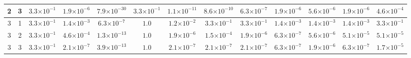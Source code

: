 \begin{landscape}
\begin{table}[H]
{\begin{tabular}{ccccccccccccc}
\hline
2 & 3 & $3.3{\scriptstyle\times 10^{-1}}$ & $1.9{\scriptstyle\times 10^{-6}}$ & \textbf{$7.9{\scriptstyle\times 10^{-30}}$} & $3.3{\scriptstyle\times 10^{-1}}$ & $1.1{\scriptstyle\times 10^{-11}}$ & $8.6{\scriptstyle\times 10^{-10}}$ & $6.3{\scriptstyle\times 10^{-7}}$ & $1.9{\scriptstyle\times 10^{-6}}$ & $5.6{\scriptstyle\times 10^{-6}}$ & $1.9{\scriptstyle\times 10^{-6}}$ & $4.6{\scriptstyle\times 10^{-4}}$ \\
\hline
3 & 1 & $3.3{\scriptstyle\times 10^{-1}}$ & $1.4{\scriptstyle\times 10^{-3}}$ & \textbf{$6.3{\scriptstyle\times 10^{-7}}$} & $1.0$ & $1.2{\scriptstyle\times 10^{-2}}$ & $3.3{\scriptstyle\times 10^{-1}}$ & $3.3{\scriptstyle\times 10^{-1}}$ & $1.4{\scriptstyle\times 10^{-3}}$ & $1.4{\scriptstyle\times 10^{-3}}$ & $1.4{\scriptstyle\times 10^{-3}}$ & $3.3{\scriptstyle\times 10^{-1}}$ \\
\hline
3 & 2 & $3.3{\scriptstyle\times 10^{-1}}$ & $4.6{\scriptstyle\times 10^{-4}}$ & \textbf{$1.3{\scriptstyle\times 10^{-13}}$} & $1.0$ & $1.9{\scriptstyle\times 10^{-6}}$ & $1.5{\scriptstyle\times 10^{-4}}$ & $1.9{\scriptstyle\times 10^{-6}}$ & $6.3{\scriptstyle\times 10^{-7}}$ & $5.6{\scriptstyle\times 10^{-6}}$ & $5.1{\scriptstyle\times 10^{-5}}$ & $5.1{\scriptstyle\times 10^{-5}}$ \\
\hline
3 & 3 & $3.3{\scriptstyle\times 10^{-1}}$ & $2.1{\scriptstyle\times 10^{-7}}$ & \textbf{$3.9{\scriptstyle\times 10^{-13}}$} & $1.0$ & $2.1{\scriptstyle\times 10^{-7}}$ & $2.1{\scriptstyle\times 10^{-7}}$ & $2.1{\scriptstyle\times 10^{-7}}$ & $6.3{\scriptstyle\times 10^{-7}}$ & $1.9{\scriptstyle\times 10^{-6}}$ & $6.3{\scriptstyle\times 10^{-7}}$ & $1.7{\scriptstyle\times 10^{-5}}$ \\
\bottomrule
\end{tabular}
}%
\end{table}
\end{landscape}

